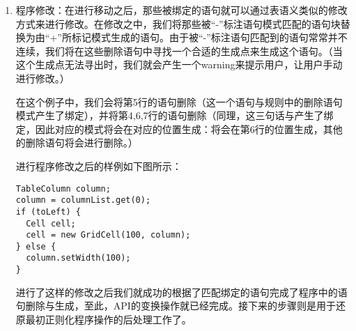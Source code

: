 \begin{enumerate}
因此，根据之前的绑定关系，我们将上图中的  移动到分支语句的第一个分支中，但如果仅仅将这条语句放入分支中，该程序的语义就与原有的程序产生了不同，因而我们在移动的同时还会创建一个  分支，从而保持语义的等价性。

在这个样例中最后的移动结果如图所示：（ 被复制到了分支语句的两个分支中，上一步匹配到的三条语句都同时出现在了分支中）。

\begin{center}
\begin{smpage}{0.5\columnwidth}
\begin{lstlisting}[style=java]
TableColumn column;
column = columnList.get(0);
if (toLeft) {
  column.setWidth(100);
  Cell cell;
  cell = new TableCell();
  column.add(cell);
} else {
  column.setWidth(100);
}
\end{lstlisting}
\end{smpage}
\end{center}

\item 程序修改：在进行移动之后，那些被绑定的语句就可以通过表语义类似的修改方式来进行修改。在修改之中，我们将那些被“-”标注语句模式匹配的语句块替换为由“+”所标记模式生成的语句。由于被“-”标注语句匹配到的语句常常并不连续，我们将在这些删除语句中寻找一个合适的生成点来生成这个语句。（当这个生成点无法寻出时，我们就会产生一个warning来提示用户，让用户手动进行修改。）

在这个例子中，我们会将第5行的语句删除（这一个语句与规则中的删除语句模式产生了绑定），并将第4,6,7行的语句删除（同理，这三句话与产生了绑定，因此对应的模式将会在对应的位置生成：将会在第6行的位置生成，其他的删除语句将会进行删除。）

进行程序修改之后的样例如下图所示：

\begin{center}
\begin{smpage}{0.5\columnwidth}
\begin{lstlisting}[style=java]
TableColumn column;
column = columnList.get(0);
if (toLeft) {
  Cell cell;
  cell = new GridCell(100, column);
} else {
  column.setWidth(100);
}
\end{lstlisting}
\end{smpage}
\end{center}

进行了这样的修改之后我们就成功的根据了匹配绑定的语句完成了程序中的语句删除与生成，至此，API的变换操作就已经完成。接下来的步骤则是用于还原最初正则化程序操作的后处理工作了。


\end{enumerate}
